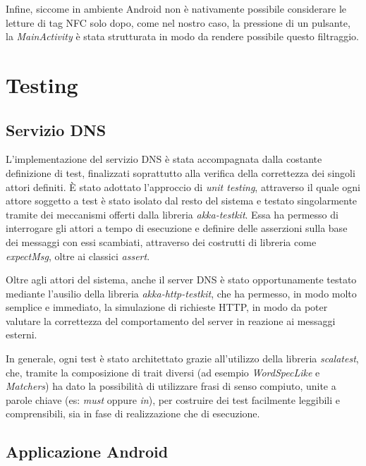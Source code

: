 \documentclass[a4paper,12pt]{report}
\begin{document}
Infine, siccome in ambiente Android non è nativamente possibile considerare le letture di tag NFC solo dopo, come nel nostro caso, la pressione di un pulsante, la \emph{MainActivity} è stata strutturata in modo da rendere possibile questo filtraggio.  

\chapter{Testing} 
\section{Servizio DNS}
L'implementazione del servizio DNS è stata accompagnata dalla costante definizione di test, finalizzati soprattutto alla verifica della correttezza dei singoli attori definiti. È stato adottato l'approccio di \emph{unit testing}, attraverso il quale ogni attore soggetto a test è stato isolato dal resto del sistema e testato singolarmente tramite dei meccanismi offerti dalla libreria \emph{akka-testkit}. Essa ha permesso di interrogare gli attori a tempo di esecuzione e definire delle asserzioni sulla base dei messaggi con essi scambiati, attraverso dei costrutti di libreria come \emph{expectMsg}, oltre ai classici \emph{assert}. 

Oltre agli attori del sistema, anche il server DNS è stato opportunamente testato mediante l'ausilio della libreria \emph{akka-http-testkit}, che ha permesso, in modo molto semplice e immediato, la simulazione di richieste HTTP, in modo da poter valutare la correttezza del comportamento del server in reazione ai messaggi esterni.

In generale, ogni test è stato architettato grazie all'utilizzo della libreria \emph{scalatest}, che, tramite la composizione di trait diversi (ad esempio \emph{WordSpecLike} e \emph{Matchers}) ha dato la possibilità di utilizzare frasi di senso compiuto, unite a parole chiave (es: \emph{must} oppure \emph{in}), per costruire dei test facilmente
leggibili e comprensibili, sia in fase di realizzazione che di esecuzione.

\section{Applicazione Android}
\end{document}
